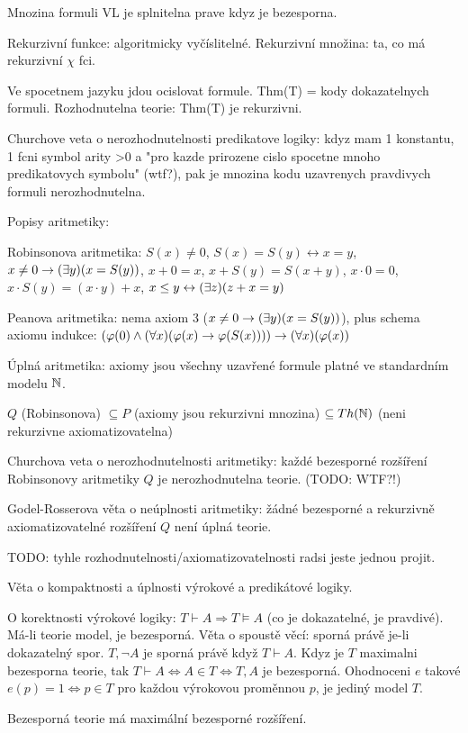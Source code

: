 Mnozina formuli VL je splnitelna prave kdyz je bezesporna.

Rekurzivní funkce: algoritmicky vyčíslitelné. Rekurzivní množina: ta, co má
rekurzivní $\chi$ fci.

Ve spocetnem jazyku jdou ocislovat formule. Thm(T) = kody dokazatelnych formuli.
Rozhodnutelna teorie: Thm(T) je rekurzivni.

Churchove veta o nerozhodnutelnosti predikatove logiky: kdyz mam 1 konstantu,
1 fcni symbol arity >0 a "pro kazde prirozene cislo spocetne mnoho predikatovych
symbolu" (wtf?), pak je mnozina kodu uzavrenych pravdivych formuli
nerozhodnutelna.

Popisy aritmetiky:

Robinsonova aritmetika: $S(x)\neq 0$, $S(x)=S(y)\leftrightarrow x=y$,
$x\neq 0\rightarrow (\exists y)(x=S(y))$, $x+0=x$, $x+S(y)=S(x+y)$, $x\cdot 0=0$,
$x\cdot S(y)=(x\cdot y)+x$, $x\leq y\leftrightarrow(\exists z)(z+x=y)$

Peanova aritmetika: nema axiom 3 ($x\neq 0\rightarrow(\exists y)(x=S(y))$), plus schema
axiomu indukce: $(\varphi(0)\wedge (\forall x)(\varphi(x)\rightarrow\varphi(S(x))))\rightarrow(\forall
x)(\varphi(x))$

Úplná aritmetika: axiomy jsou všechny uzavřené formule platné ve standardním
modelu $\mathbb{N}$.

$Q$ (Robinsonova) $\subseteq P$ (axiomy jsou rekurzivni mnozina) $\subseteq
Th(\mathbb{N})$ (neni rekurzivne axiomatizovatelna)

Churchova veta o nerozhodnutelnosti aritmetiky: každé bezesporné rozšíření
Robinsonovy aritmetiky $Q$ je nerozhodnutelna teorie. (TODO: WTF?!)

Godel-Rosserova věta o neúplnosti aritmetiky: žádné bezesporné a rekurzivně
axiomatizovatelné rozšíření $Q$ není úplná teorie.

TODO: tyhle rozhodnutelnosti/axiomatizovatelnosti radsi jeste jednou projit.

Věta o kompaktnosti a úplnosti výrokové a predikátové logiky.

O korektnosti výrokové logiky: $T\vdash A \Rightarrow T\vDash A$ (co je
dokazatelné, je pravdivé).
Má-li teorie model, je bezesporná.
Věta o spoustě věcí: sporná právě je-li dokazatelný spor. $T,\neg A$ je sporná
právě když $T\vdash A$. Kdyz je $T$ maximalni bezesporna teorie, tak
$T\vdash A \Leftrightarrow A\in T \Leftrightarrow T,A$ je bezesporná.
Ohodnoceni $e$ takové $e(p)=1 \Leftrightarrow p\in T$ pro každou výrokovou
proměnnou $p$, je jediný model $T$.

Bezesporná teorie má maximální bezesporné rozšíření.

